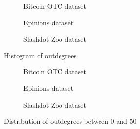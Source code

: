 \begin{figure}[t]
    \centering
        \begin{subfigure}[t]{0.30\textwidth}
        \caption{Bitcoin OTC dataset}
        \label{subfig:bitcoinotc_outdegrees}
    \end{subfigure}
    \hfill
        \begin{subfigure}[t]{0.30\textwidth}
        \caption{Epinions dataset}
        \label{subfig:epinions_outdegrees}
    \end{subfigure}
    \hfill
    \begin{subfigure}[t]{0.30\textwidth}
    	\centering
    	\caption{Slashdot Zoo dataset}
	\label{subfig:slashdot_outdegrees}
    \end{subfigure}
    \caption{Histogram of outdegrees}
    \label{fig:datasets_outdegree_distr}
\end{figure}

\begin{figure}[t]
    \centering
        \begin{subfigure}[t]{0.30\textwidth}
        \caption{Bitcoin OTC dataset}
        \label{subfig:bitcoinotc_outdegrees}
    \end{subfigure}
    \hfill
        \begin{subfigure}[t]{0.30\textwidth}
        \caption{Epinions dataset}
        \label{subfig:epinions_outdegrees}
    \end{subfigure}
    \hfill
    \begin{subfigure}[t]{0.30\textwidth}
    	\centering
    	\caption{Slashdot Zoo dataset}
	\label{subfig:slashdot_outdegrees}
    \end{subfigure}
    \caption{Distribution of outdegrees between 0 and 50}
    \label{fig:datasets_outdegree_distr_50}
\end{figure}

